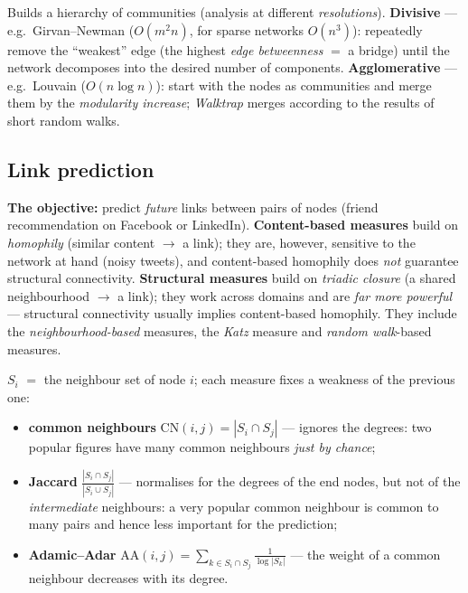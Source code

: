 \documentclass[11pt,a4paper]{article}
\theoremstyle{definition}
\providecommand{\uv}[1]{``#1''}
\begin{document}
\begin{defbox}
Builds a hierarchy of communities (analysis at different \emph{resolutions}).
\textbf{Divisive} --- e.g.\ Girvan--Newman ($O(m^2n)$, for sparse networks $O(n^3)$):
repeatedly remove the \uv{weakest} edge (the highest \emph{edge betweenness} $=$ a bridge)
until the network decomposes into the desired number of components.
\textbf{Agglomerative} --- e.g.\ Louvain ($O(n\log n)$): start with the nodes as communities
and merge them by the \emph{modularity increase}; \emph{Walktrap} merges according to the
results of short random walks.
\end{defbox}

\subsection{Link prediction}

\begin{defbox}
\textbf{The objective:} predict \emph{future} links between pairs of nodes (friend
recommendation on Facebook or LinkedIn). \textbf{Content-based measures} build on
\emph{homophily} (similar content $\to$ a link); they are, however, sensitive to the network
at hand (noisy tweets), and content-based homophily does \emph{not} guarantee structural
connectivity. \textbf{Structural measures} build on \emph{triadic closure} (a shared
neighbourhood $\to$ a link); they work across domains and are \emph{far more powerful} ---
structural connectivity usually implies content-based homophily. They include the
\emph{neighbourhood-based} measures, the \emph{Katz} measure and \emph{random walk}-based
measures.
\end{defbox}

\begin{defbox}
$S_i$ $=$ the neighbour set of node $i$; each measure fixes a weakness of the previous one:
\begin{itemize}
\item \textbf{common neighbours} $\mathrm{CN}(i,j)=|S_i\cap S_j|$ --- ignores the degrees:
      two popular figures have many common neighbours \emph{just by chance};
\item \textbf{Jaccard} $\frac{|S_i\cap S_j|}{|S_i\cup S_j|}$ --- normalises for the degrees
      of the end nodes, but not of the \emph{intermediate} neighbours: a very popular common
      neighbour is common to many pairs and hence less important for the prediction;
\item \textbf{Adamic--Adar} $\mathrm{AA}(i,j)=\sum_{k\in S_i\cap S_j}\frac{1}{\log|S_k|}$
      --- the weight of a common neighbour decreases with its degree.
\end{itemize}
\end{defbox}
\end{document}
